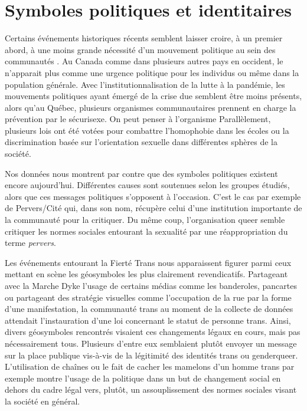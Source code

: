 \section{Symboles politiques et identitaires}
\label{sec:symboles_politiques_et_identitaire}
Certains événements historiques récents semblent laisser croire, à un premier abord, à une moins grande nécessité d'un mouvement politique au sein des communautés \lgbt{}.
Au Canada comme dans plusieurs autres pays en occident, le \sida{} n'apparait plus comme une urgence politique pour les individus \lgbt{} ou même dans la population générale.
Avec l'institutionnalisation de la lutte à la pandémie, les mouvements politiques ayant  émergé de la crise due \vih{} semblent être moins présents, alors qu'au Québec, plusieurs organismes communautaires prennent en charge la prévention par le sécurisexe.
On peut penser à l'organisme \miels{}
Parallèlement, plusieurs lois ont été votées pour combattre l'homophobie dans les écoles ou la discrimination basée sur l'orientation sexuelle dans différentes sphères de la société.

Nos données nous montrent par contre que des symboles politiques existent encore aujourd'hui.
Différentes causes sont soutenues selon les groupes étudiés, alors que ces messages politiques s'opposent à l'occasion.
C'est le cas par exemple de Pervers/Cité qui, dans son nom, récupère celui d'une institution importante de la communauté \lgbt{} pour la critiquer.
Du même coup, l'organisation queer semble critiquer les normes sociales entourant la sexualité par une réappropriation du terme \emph{pervers}.

Les événements entourant la Fierté Trans nous apparaissent figurer parmi ceux mettant en scène les géosymboles les plus clairement revendicatifs.
Partageant avec la Marche Dyke l'usage de certains médias comme les banderoles, pancartes ou partageant des stratégie visuelles comme l'occupation de la rue par la forme d'une manifestation, la communauté trans au moment de la collecte de données attendait l'instauration d'une loi concernant le statut de personne trans.
Ainsi, divers géosymboles rencontrés visaient ces changements légaux en cours, mais pas nécessairement tous.
Plusieurs d'entre eux semblaient plutôt envoyer un message sur la place publique vis-à-vis de la légitimité des identités trans ou genderqueer.
L'utilisation de chaînes ou le fait de cacher les mamelons d'un homme trans par exemple montre l'usage de la politique dans un but de changement social en dehors du cadre légal vers, plutôt, un assouplissement des normes sociales visant la société en général.

